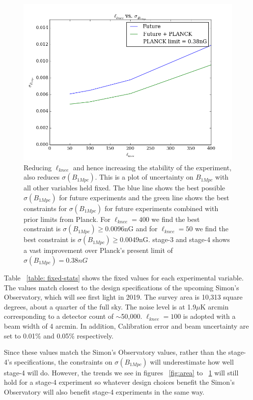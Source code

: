 \begin{figure}[h]
\centering
\includegraphics[scale=0.7]{images/knee.png}
\caption{Reducing $\ell_{knee}$ and hence increasing the stability of the experiment, also reduces $\sigma(B_{1Mpc})$. This is a plot of uncertainty on $B_{1Mpc}$ with all other variables held fixed. The blue line shows the best possible $\sigma(B_{1Mpc})$ for future experiments and the green line shows the best constraints for $\sigma(B_{1Mpc})$ for future experiments combined with prior limits from Planck. For $\ell_{knee} = 400$ we find the best constraint is $\sigma(B_{1Mpc}) \geq 0.0096$nG and for $\ell_{knee} = 50$ we find the best constraint is $\sigma(B_{1Mpc}) \geq 0.0049$nG. stage-3 and stage-4 shows a vast improvement over Planck's present limit of $\sigma(B_{1Mpc}) = 0.38nG$}
\label{fig:knee}
\end{figure}

Table ~\ref{table: fixed-stats} shows the fixed values for each experimental variable. The values match closest to the design specifications of the upcoming Simon's Observatory, which will see first light in 2019. The survey area is 10,313 square degrees, about a quarter of the full sky. The noise level is at 1.9$\mu$K arcmin corresponding to a detector count of $\sim$50,000. $\ell_{knee} = 100$ is adopted with a beam width of 4 arcmin. In addition, Calibration error and beam uncertainty are set to 0.01\% and 0.05\% respectively.

Since these values match the Simon's Observatory values, rather than the stage-4's specifications, the constraints on $\sigma(B_{1Mpc})$ will underestimate how well stage-4 will do. However, the trends we see in figures ~\ref{fig:area} to ~\ref{fig:knee} will still hold for a stage-4 experiment so whatever design choices benefit the Simon's Observatory will also benefit stage-4 experiments in the same way.

